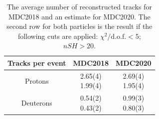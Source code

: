 \documentclass[12pt,a4paper,openright, oneside, titlepage]{book} %
\begin{document}
\begin{table}
\centering
\begin{tabular}{|c|c|c|}
\hline
Tracks per event& MDC2018 & MDC2020 \\
\hline
\hline
Protons& 
\makecell{2.65(4) \\ 1.99(4)} & 
\makecell{ 2.69(4) \\ 1.95(4)} \\
\hline
Deuterons & 
\makecell{0.54(2) \\ 0.43(2)} & 
\makecell{ 0.99(3) \\ 0.80(3)} \\
\hline
\end{tabular}
\caption{The average number of reconstructed tracks for MDC2018 and an estimate for MDC2020.
The second row for both particles is the result if the following cuts are applied: $\chi^2/\textrm{d.o.f.}<5$; $nSH>20$.}
\label{T_syst}
\end{table}

\end{document}
